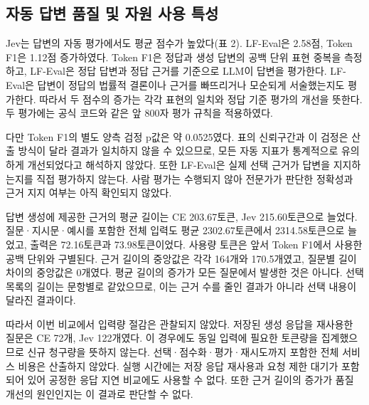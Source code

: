 \subsection{자동 답변 품질 및 자원 사용 특성}
\label{sec:ch4_answer_resources}

Jev는 답변의 자동 평가에서도 평균 점수가 높았다(표 2). LF-Eval은 2.58점, Token F1은 1.12점 증가하였다. Token F1은 정답과 생성 답변의 공백 단위 표현 중복을 측정하고, LF-Eval은 정답 답변과 정답 근거를 기준으로 LLM이 답변을 평가한다. LF-Eval은 답변이 정답의 법률적 결론이나 근거를 빠뜨리거나 모순되게 서술했는지도 평가한다. 따라서 두 점수의 증가는 각각 표현의 일치와 정답 기준 평가의 개선을 뜻한다. 두 평가에는 공식 코드와 같은 앞 800자 평가 규칙을 적용하였다.

다만 Token F1의 별도 양측 검정 p값은 약 0.0525였다. 표의 신뢰구간과 이 검정은 산출 방식이 달라 결과가 일치하지 않을 수 있으므로, 모든 자동 지표가 통계적으로 유의하게 개선되었다고 해석하지 않았다. 또한 LF-Eval은 실제 선택 근거가 답변을 지지하는지를 직접 평가하지 않는다. 사람 평가는 수행되지 않아 전문가가 판단한 정확성과 근거 지지 여부는 아직 확인되지 않았다.

답변 생성에 제공한 근거의 평균 길이는 CE 203.67토큰, Jev 215.60토큰으로 늘었다. 질문·지시문·예시를 포함한 전체 입력도 평균 2302.67토큰에서 2314.58토큰으로 늘었고, 출력은 72.16토큰과 73.98토큰이었다. 사용량 토큰은 앞서 Token F1에서 사용한 공백 단위와 구별된다. 근거 길이의 중앙값은 각각 164개와 170.5개였고, 질문별 길이 차이의 중앙값은 0개였다. 평균 길이의 증가가 모든 질문에서 발생한 것은 아니다. 선택 목록의 길이는 문항별로 같았으므로, 이는 근거 수를 줄인 결과가 아니라 선택 내용이 달라진 결과이다.

따라서 이번 비교에서 입력량 절감은 관찰되지 않았다. 저장된 생성 응답을 재사용한 질문은 CE 72개, Jev 122개였다. 이 경우에도 동일 입력에 필요한 토큰량을 집계했으므로 신규 청구량을 뜻하지 않는다. 선택·점수화·평가·재시도까지 포함한 전체 서비스 비용은 산출하지 않았다. 실행 시간에는 저장 응답 재사용과 요청 제한 대기가 포함되어 있어 공정한 응답 지연 비교에도 사용할 수 없다. 또한 근거 길이의 증가가 품질 개선의 원인인지는 이 결과로 판단할 수 없다.
